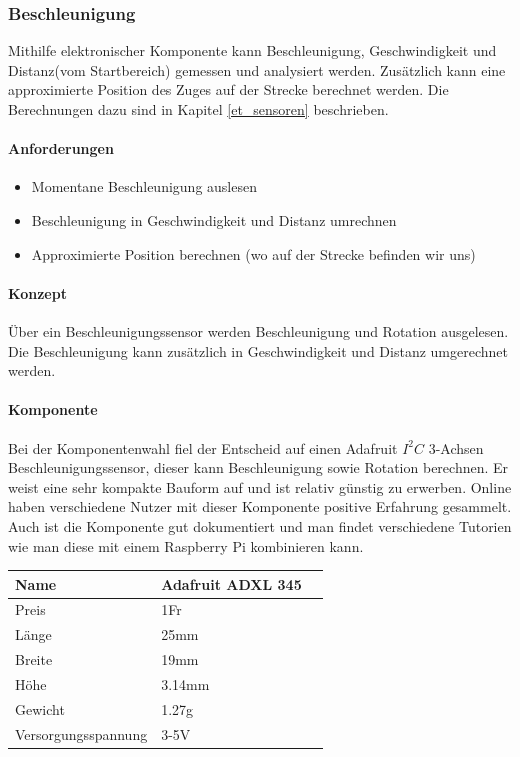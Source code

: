 \documentclass[../../main.tex]{subfiles}
\begin{document}
\subsubsection{Beschleunigung} \label{pi_beschleunigung}
Mithilfe elektronischer Komponente kann Beschleunigung, Geschwindigkeit und Distanz(vom Startbereich) gemessen und analysiert werden. Zusätzlich kann eine approximierte Position des Zuges auf der Strecke berechnet werden. Die Berechnungen dazu sind in Kapitel \ref{et_sensoren} beschrieben.

\paragraph{Anforderungen}
\begin{itemize}
    \item Momentane Beschleunigung auslesen
    \item Beschleunigung in Geschwindigkeit und Distanz umrechnen
    \item Approximierte Position berechnen (wo auf der Strecke befinden wir uns)
\end{itemize}

\paragraph{Konzept}
Über ein Beschleunigungssensor werden Beschleunigung und Rotation ausgelesen. Die Beschleunigung kann zusätzlich in Geschwindigkeit und Distanz umgerechnet werden.

\paragraph{Komponente}
Bei der Komponentenwahl fiel der Entscheid auf einen Adafruit $I^2C$ 3-Achsen Beschleunigungssensor, dieser kann Beschleunigung sowie Rotation berechnen. Er weist eine sehr kompakte Bauform auf und ist relativ günstig zu erwerben. Online haben verschiedene Nutzer mit dieser Komponente positive Erfahrung gesammelt. Auch ist die Komponente gut dokumentiert und man findet verschiedene Tutorien wie man diese mit einem Raspberry Pi kombinieren kann.

\begin{table}[H]
\begin{flushleft}
\begin{tabular}{lll}
Name & Adafruit ADXL 345  \\ \hline
Preis & 1Fr               \\ \hline
Länge & 25mm              \\ \hline
Breite & 19mm             \\ \hline
Höhe & 3.14mm             \\ \hline
Gewicht & 1.27g           \\ \hline
Versorgungsspannung & 3-5V \\ \hline
\end{tabular}
\end{flushleft}
\end{table}
\end{document}
